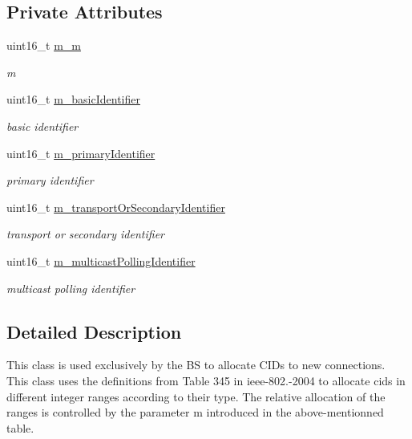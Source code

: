 \subsection*{Private Attributes}
\begin{DoxyCompactItemize}
\item 
uint16\+\_\+t \hyperlink{classns3_1_1CidFactory_a109a5eb2a8113c30f0f1446017a88578}{m\+\_\+m}
\begin{DoxyCompactList}\small\item\em m \end{DoxyCompactList}\item 
uint16\+\_\+t \hyperlink{classns3_1_1CidFactory_a3d676e4dc7047b682875b547dbcb6a0c}{m\+\_\+basic\+Identifier}
\begin{DoxyCompactList}\small\item\em basic identifier \end{DoxyCompactList}\item 
uint16\+\_\+t \hyperlink{classns3_1_1CidFactory_ae4ec7553ff7332a56fccd2ecb740fc87}{m\+\_\+primary\+Identifier}
\begin{DoxyCompactList}\small\item\em primary identifier \end{DoxyCompactList}\item 
uint16\+\_\+t \hyperlink{classns3_1_1CidFactory_a77d828478ef29d8c0eeede6e9406401b}{m\+\_\+transport\+Or\+Secondary\+Identifier}
\begin{DoxyCompactList}\small\item\em transport or secondary identifier \end{DoxyCompactList}\item 
uint16\+\_\+t \hyperlink{classns3_1_1CidFactory_aa942d62831ffb00fddea228df435a303}{m\+\_\+multicast\+Polling\+Identifier}
\begin{DoxyCompactList}\small\item\em multicast polling identifier \end{DoxyCompactList}\end{DoxyCompactItemize}


\subsection{Detailed Description}
This class is used exclusively by the BS to allocate C\+I\+Ds to new connections. This class uses the definitions from Table 345 in ieee-\/802.-\/2004 to allocate cids in different integer ranges according to their type. The relative allocation of the ranges is controlled by the parameter \textquotesingle{}m\textquotesingle{} introduced in the above-\/mentionned table.

